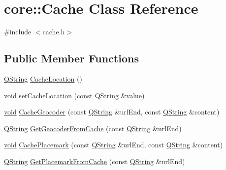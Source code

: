 \hypertarget{classcore_1_1_cache}{\section{core\-:\-:\-Cache \-Class \-Reference}
\label{classcore_1_1_cache}
}


{\ttfamily \#include $<$cache.\-h$>$}

\subsection*{\-Public \-Member \-Functions}
\begin{DoxyCompactItemize}
\item 
\hyperlink{group___u_a_v_objects_plugin_gab9d252f49c333c94a72f97ce3105a32d}{\-Q\-String} \hyperlink{group___o_p_map_widget_ga3b971bf3f42b18ca30dc670b0a3252fa}{\-Cache\-Location} ()
\item 
\hyperlink{group___u_a_v_objects_plugin_ga444cf2ff3f0ecbe028adce838d373f5c}{void} \hyperlink{group___o_p_map_widget_ga426941e0eaaa025997f73cd20da01189}{set\-Cache\-Location} (const \hyperlink{group___u_a_v_objects_plugin_gab9d252f49c333c94a72f97ce3105a32d}{\-Q\-String} \&value)
\item 
\hyperlink{group___u_a_v_objects_plugin_ga444cf2ff3f0ecbe028adce838d373f5c}{void} \hyperlink{group___o_p_map_widget_ga1c59fdf57a8e404d9069644cc2a06d68}{\-Cache\-Geocoder} (const \hyperlink{group___u_a_v_objects_plugin_gab9d252f49c333c94a72f97ce3105a32d}{\-Q\-String} \&url\-End, const \hyperlink{group___u_a_v_objects_plugin_gab9d252f49c333c94a72f97ce3105a32d}{\-Q\-String} \&content)
\item 
\hyperlink{group___u_a_v_objects_plugin_gab9d252f49c333c94a72f97ce3105a32d}{\-Q\-String} \hyperlink{group___o_p_map_widget_ga03c3c69129aa5d774e0cfc1b7cc4ace7}{\-Get\-Geocoder\-From\-Cache} (const \hyperlink{group___u_a_v_objects_plugin_gab9d252f49c333c94a72f97ce3105a32d}{\-Q\-String} \&url\-End)
\item 
\hyperlink{group___u_a_v_objects_plugin_ga444cf2ff3f0ecbe028adce838d373f5c}{void} \hyperlink{group___o_p_map_widget_ga605683519dbd3609033f61edfdbd6da3}{\-Cache\-Placemark} (const \hyperlink{group___u_a_v_objects_plugin_gab9d252f49c333c94a72f97ce3105a32d}{\-Q\-String} \&url\-End, const \hyperlink{group___u_a_v_objects_plugin_gab9d252f49c333c94a72f97ce3105a32d}{\-Q\-String} \&content)
\item 
\hyperlink{group___u_a_v_objects_plugin_gab9d252f49c333c94a72f97ce3105a32d}{\-Q\-String} \hyperlink{group___o_p_map_widget_ga6b5384bc829769fac7099d2f62188361}{\-Get\-Placemark\-From\-Cache} (const \hyperlink{group___u_a_v_objects_plugin_gab9d252f49c333c94a72f97ce3105a32d}{\-Q\-String} \&url\-End)

\end{DoxyCompactItemize}
